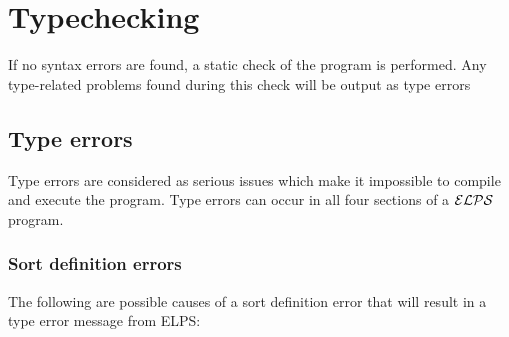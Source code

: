 \documentclass[12pt, letterpaper]{article}
\begin{document}
 

\section{Typechecking}
If no syntax errors are found, a static check of the program is performed. Any type-related problems found during this check 
will be output as type errors
\subsection{Type errors}
Type errors are considered as serious issues which make it  impossible to compile and execute the program.
Type errors can occur in all four sections of a ${\cal ELPS}$ program.
\subsubsection{Sort definition errors}
The following are possible causes of a sort definition error  that will result in a type error  message from ELPS:
\end{document}
